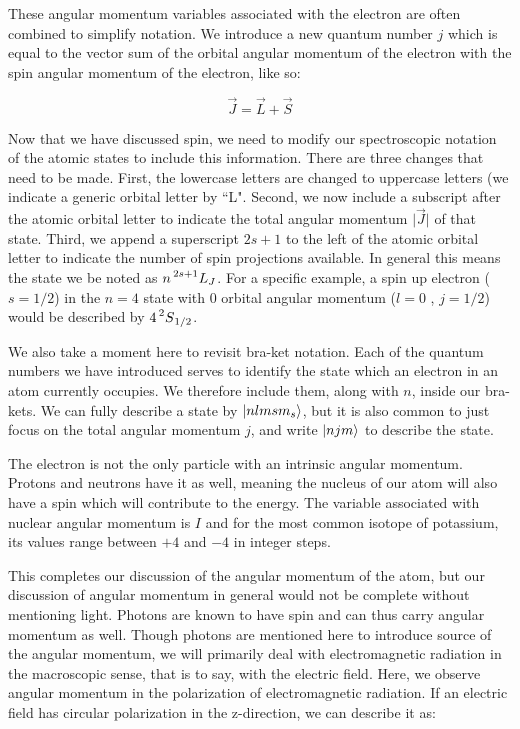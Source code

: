 \documentclass[12pt]{article}
\begin{document}
        These angular momentum variables associated with the
        electron are often combined to simplify notation. We
        introduce a new quantum number $j$ which is equal to
        the vector sum of the orbital angular momentum of the
        electron with the spin angular momentum of the electron,
        like so: 

        \begin{equation}
            \vec{J} = \vec{L} + \vec{S}
        \end{equation}

        Now that we have discussed spin, we need to modify our 
        spectroscopic notation of the atomic states to include
        this information. There are three changes that need to 
		be made. First, the lowercase letters are changed to
		uppercase letters (we indicate a generic orbital letter
		by ``L". Second, we now include a subscript after
        the atomic orbital letter to indicate the total angular
        momentum $\vert\vec{J}\vert$ of that state. 
		Third, we append a superscript $2s+1$ to the left of
		the atomic orbital letter to indicate the number of
		spin projections available. In general
		this means the state we be noted as $n\prescript{2s+1}{}L_{J}$. For 
		a specific example, 
        a spin up electron ($s=1/2$) in the $n=4$ state with 
        0 orbital angular momentum ($l=0$ , $j=1/2$) would be 
        described by $4\prescript{2}{}S_{1/2}$.

		We also take a moment here to revisit bra-ket notation.
		Each of the quantum numbers we have introduced serves
		to identify the state which an electron in an atom 
		currently occupies. We therefore include them, along with
		$n$, inside our bra-kets. We can fully describe a state by
		$\ket{nlmsm_s}$, but it is also common to just focus on
		the total angular momentum $j$, and write $\ket{njm}$ to
		describe the state.

        The electron is not the only particle with an intrinsic
        angular momentum. Protons and neutrons have it as well,
        meaning the nucleus of our atom will also have a
        spin which will contribute to the energy. The variable
        associated with nuclear angular momentum is $I$ and
        for the most common isotope of potassium, its values
        range between $+4$ and $-4$ in integer steps. 
	
		This completes our discussion of the angular momentum
		of the atom, but our discussion of angular momentum in 
		general would not be complete without mentioning light.
		Photons are known to have spin and can thus carry 
		angular momentum as well. Though photons are mentioned
		here to introduce source of the angular momentum,
		we will primarily deal with
		electromagnetic radiation in the macroscopic sense, 
		that is to say, with the electric field. Here, we 
		observe angular momentum in the polarization of 
		electromagnetic radiation. If an electric field has
		circular polarization in the z-direction, we can 
		describe it as:
\end{document}
